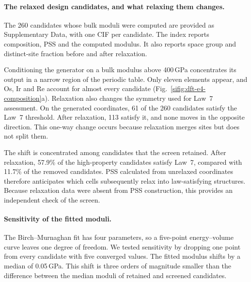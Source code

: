 \paragraph{The relaxed design candidates, and what relaxing them changes.} The 260
candidates whose bulk moduli were computed are provided as Supplementary Data, with one CIF
per candidate. The index reports composition, PSS and the computed modulus. It also reports
space group and distinct-site fraction before and after relaxation.

Conditioning the generator on a bulk modulus above 400\,GPa concentrates its output in a
narrow region of the periodic table. Only eleven elements appear, and Os, Ir and Re account
for almost every candidate (Fig.~\ref{sifig:dft-e4-composition}a). Relaxation also changes
the symmetry used for Law~7 assessment. On the generated coordinates, 61 of the 260
candidates satisfy the Law~7 threshold. After relaxation, 113 satisfy it, and none moves in the
opposite direction. This one-way change occurs because relaxation merges sites but does not
split them.

The shift is concentrated among candidates that the screen retained. After relaxation,
57.9\% of the high-property candidates satisfy Law~7, compared with 11.7\% of the removed
candidates. PSS calculated from unrelaxed coordinates therefore anticipates which cells
subsequently relax into law-satisfying structures. Because relaxation data were absent from
PSS construction, this provides an independent check of the screen.

\paragraph{Sensitivity of the fitted moduli.} The Birch--Murnaghan fit has four parameters,
so a five-point energy--volume curve leaves one degree of freedom. We tested sensitivity by
dropping one point from every candidate with five converged values. The fitted modulus
shifts by a median of 0.05\,GPa. This shift is three orders of magnitude smaller than the
difference between the median moduli of retained and screened candidates.
